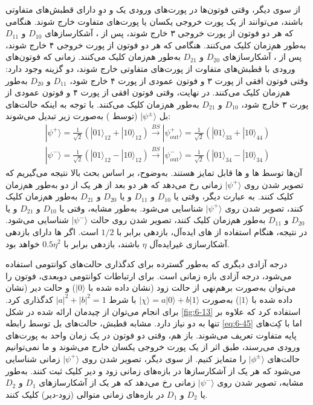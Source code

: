 از سوی دیگر، وقتی فوتون‌ها در پورت‌های ورودی یک و دوِ  دارای قطبش‌های متفاوتی باشند، می‌توانند از یک پورت خروجی یکسان یا پورت‌های متفاوت خارج شوند. هنگامی که هر دو فوتون از پورت خروجی ۳ خارج شوند، پس از ، آشکارسازهای $D_{10}$ و $D_{11}$ به‌طور هم‌زمان کلیک می‌کنند. هنگامی که هر دو فوتون از پورت خروجی ۴ خارج شوند، پس از ، آشکارسازهای $D_{20}$ و $D_{21}$ به‌طور هم‌زمان کلیک می‌کنند. زمانی که فوتون‌های ورودی با قطبش‌های متفاوت از پورت‌های متفاوتی خارج شوند، دو گزینه وجود دارد: وقتی فوتون افقی از پورت ۳ و فوتون عمودی از پورت ۴ خارج شود، $D_{11}$ و $D_{20}$ به‌طور هم‌زمان کلیک می‌کنند. در نهایت، وقتی فوتون افقی از پورت ۴ و فوتون عمودی از پورت ۳ خارج شود، $D_{10}$ و $D_{21}$ به‌طور هم‌زمان کلیک می‌کنند. با توجه به اینکه حالت‌های بل $|\psi^{\pm}\rangle$ (توسط ) به‌صورت زیر تبدیل می‌شوند:
\begin{equation}
	\begin{aligned}
		|\psi^+\rangle = \frac{1}{\sqrt{2}} (|01\rangle_{12} + |10\rangle_{12}) \xrightarrow{BS} |\psi_{\text{out}}^+\rangle = \frac{1}{\sqrt{2}} (|01\rangle_{33} + |10\rangle_{44}) \\
		|\psi^-\rangle = \frac{1}{\sqrt{2}} (|01\rangle_{12} - |10\rangle_{12}) \xrightarrow{BS} |\psi_{\text{out}}^-\rangle = \frac{1}{\sqrt{2}} (|01\rangle_{34} - |10\rangle_{34})
	\end{aligned}
	\label{eq:6-47}
\end{equation}
آن‌ها توسط ها و ها قابل تمایز هستند. به‌وضوح، بر اساس بحث بالا نتیجه می‌گیریم که تصویر شدن روی $|\psi^+\rangle$ زمانی رخ می‌دهد که هر دو  بعد از هر یک از دو  به‌طور هم‌زمان کلیک کنند. به عبارت دیگر، وقتی یا $D_{10}$ و $D_{11}$ و یا $D_{20}$ و $D_{21}$ به‌طور هم‌زمان کلیک کنند، تصویر شدن روی $|\psi^+\rangle$ شناسایی می‌شود. به‌طور مشابه، وقتی یا $D_{10}$ و $D_{21}$ و یا $D_{20}$ و $D_{11}$ به‌طور هم‌زمان کلیک کنند، تصویر شدن روی حالت $|\psi^-\rangle$ شناسایی می‌شود. در نتیجه، هنگام استفاده از های ایده‌آل، بازدهی  برابر با $1/2$ است. اگر ها دارای بازدهی آشکارسازی غیرایده‌آل $\eta$ باشند، بازدهی  برابر با $0.5\eta^2$ خواهد بود.

درجه آزادی دیگری که به‌طور گسترده برای کدگذاری حالت‌های کوانتومی استفاده می‌شود، درجه آزادی بازه زمانی است. برای ارتباطات کوانتومی دوبعدی، فوتون را می‌توان به‌صورت برهم‌نهی از حالت زود (نشان‌ داده شده با $|0\rangle$) و حالت دیر (نشان داده شده با $|1\rangle$) به‌صورت $|\chi\rangle = a|0\rangle + b|1\rangle$ با شرط $|a|^2 + |b|^2 = 1$ کدگذاری کرد. برای انجام  می‌توان از چیدمان ارائه شده در شکل \ref{fig:6-13} استفاده کرد که علاوه بر  تنها به دو  نیاز دارد. مشابه قطبش، حالت‌های بل توسط رابطه \eqref{eq:6-45} اما با کِت‌های پایه متفاوت تعریف می‌شوند. باز هم، وقتی دو فوتون در یک زمان واحد به پورت‌های ورودی  می‌رسند، طبق اثر  از یک پورت خروجی یکسان خارج می‌شوند و ما نمی‌توانیم حالت‌های $|\phi^{\pm}\rangle$ را متمایز کنیم. از سوی دیگر، تصویر شدن روی $|\psi^+\rangle$ زمانی شناسایی می‌شود که هر یک از آشکارسازها در بازه‌های زمانی زود و دیر کلیک ثبت کنند. به‌طور مشابه، تصویر شدن روی $|\psi^-\rangle$ زمانی رخ می‌دهد که هر یک از آشکارسازهای $D_1$ و $D_2$ یا $D_2$ و $D_1$ در بازه‌های زمانی متوالی (زود-دیر) کلیک کنند.

